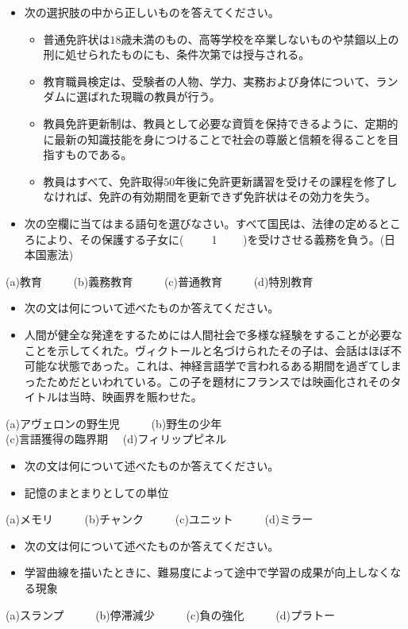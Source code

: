\documentclass[12pt]{jarticle}
\numberwithin{equation}{subsection}
\begin{document}
\begin{itemize}
  \item[($4$)]次の選択肢の中から正しいものを答えてください。
  \begin{itemize}
  \item[(a)]普通免許状は$18$歳未満のもの、高等学校を卒業しないものや禁錮以上の刑に処せられたものにも、条件次第では授与される。
  \item[(b)]教育職員検定は、受験者の人物、学力、実務および身体について、ランダムに選ばれた現職の教員が行う。
  \item[(c)]教員免許更新制は、教員として必要な資質を保持できるように、定期的に最新の知識技能を身につけることで社会の尊厳と信頼を得ることを目指すものである。
  \item[(d)]教員はすべて、免許取得$50$年後に免許更新講習を受けその課程を修了しなければ、免許の有効期間を更新できず免許状はその効力を失う。
  \end{itemize}
\end{itemize}
\begin{itemize}
  \item[($5$)] 次の空欄に当てはまる語句を選びなさい。すべて国民は、法律の定めるところにより、その保護する子女に(\ \ \ \ \ 1 \ \ \ \ )を受けさせる義務を負う。(日本国憲法)
\end{itemize}
\begin{center}
  (a)教育 \ \ \ \ \ (b)義務教育 \ \ \ \ \ (c)普通教育 \ \ \ \ \  (d)特別教育
\end{center}
\begin{itemize}
  \item[($6$)]次の文は何について述べたものか答えてください。
  \item[]人間が健全な発達をするためには人間社会で多様な経験をすることが必要なことを示してくれた。ヴィクトールと名づけられたその子は、会話はほぼ不可能な状態であった。これは、神経言語学で言われるある期間を過ぎてしまったためだといわれている。この子を題材にフランスでは映画化されそのタイトルは当時、映画界を賑わせた。
\end{itemize}
\begin{center}
  (a)アヴェロンの野生児 \ \ \ \ \ (b)野生の少年 \\ (c)言語獲得の臨界期 \ \ (d)フィリップピネル
\end{center}
\begin{itemize}
  \item[($7$)]次の文は何について述べたものか答えてください。
  \item[]記憶のまとまりとしての単位
\end{itemize}
\begin{center}
  (a)メモリ \ \ \ \ \ (b)チャンク \ \ \ \ \ (c)ユニット \ \ \ \ \  (d)ミラー
\end{center}
\begin{itemize}
  \item[($8$)]次の文は何について述べたものか答えてください。
  \item[]学習曲線を描いたときに、難易度によって途中で学習の成果が向上しなくなる現象
\end{itemize}
\begin{center}
  (a)スランプ \ \ \ \ \ (b)停滞減少 \ \ \ \ \ (c)負の強化 \ \ \ \ \  (d)プラトー
\end{center}
\end{document}
